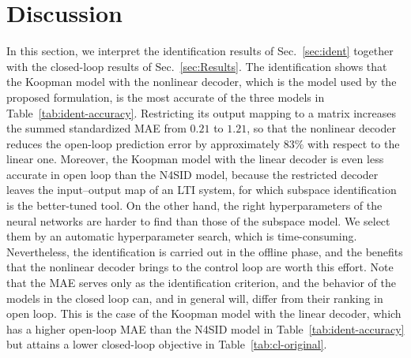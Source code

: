 \documentclass[preprint,12pt,authoryear]{elsarticle}
\theoremstyle{remark}
\begin{document}





\section{Discussion}
\label{sec:discussion}

In this section, we interpret the identification results of Sec.~\ref{sec:ident} together with the closed-loop results of Sec.~\ref{sec:Results}. The identification shows that the Koopman model with the nonlinear decoder, which is the model used by the proposed formulation, is the most accurate of the three models in Table~\ref{tab:ident-accuracy}. Restricting its output mapping to a matrix increases the summed standardized MAE from $0.21$ to $1.21$, so that the nonlinear decoder reduces the open-loop prediction error by approximately $83\%$ with respect to the linear one. Moreover, the Koopman model with the linear decoder is even less accurate in open loop than the N4SID model, because the restricted decoder leaves the input--output map of an LTI system, for which subspace identification is the better-tuned tool. On the other hand, the right hyperparameters of the neural networks are harder to find than those of the subspace model. We select them by an automatic hyperparameter search, which is time-consuming. Nevertheless, the identification is carried out in the offline phase, and the benefits that the nonlinear decoder brings to the control loop are worth this effort. Note that the MAE serves only as the identification criterion, and the behavior of the models in the closed loop can, and in general will, differ from their ranking in open loop. This is the case of the Koopman model with the linear decoder, which has a higher open-loop MAE than the N4SID model in Table~\ref{tab:ident-accuracy} but attains a lower closed-loop objective in Table~\ref{tab:cl-original}.
\end{document}
